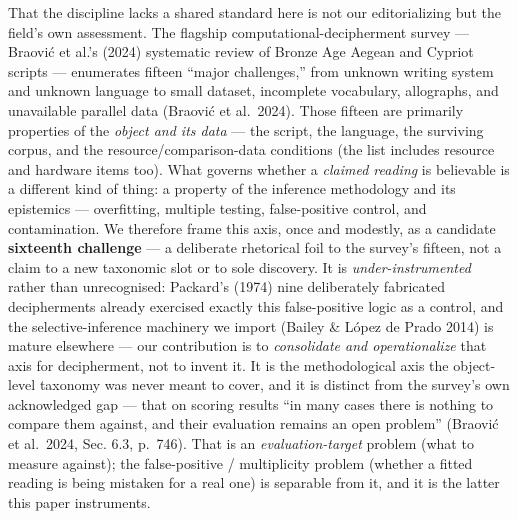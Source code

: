 \documentclass[
  10pt,
]{article}
\begin{document}
That the discipline lacks a shared standard here is not our
editorializing but the field's own assessment. The flagship
computational-decipherment survey --- Braović et al.'s (2024) systematic
review of Bronze Age Aegean and Cypriot scripts --- enumerates fifteen
``major challenges,'' from unknown writing system and unknown language
to small dataset, incomplete vocabulary, allographs, and unavailable
parallel data (Braović et al.~2024). Those fifteen are primarily
properties of the \emph{object and its data} --- the script, the
language, the surviving corpus, and the resource/comparison-data
conditions (the list includes resource and hardware items too). What
governs whether a \emph{claimed reading} is believable is a different
kind of thing: a property of the inference methodology and its
epistemics --- overfitting, multiple testing, false-positive control,
and contamination. We therefore frame this axis, once and modestly, as a
candidate \textbf{sixteenth challenge} --- a deliberate rhetorical foil
to the survey's fifteen, not a claim to a new taxonomic slot or to sole
discovery. It is \emph{under-instrumented} rather than unrecognised:
Packard's (1974) nine deliberately fabricated decipherments already
exercised exactly this false-positive logic as a control, and the
selective-inference machinery we import (Bailey \& López de Prado 2014)
is mature elsewhere --- our contribution is to \emph{consolidate and
operationalize} that axis for decipherment, not to invent it. It is the
methodological axis the object-level taxonomy was never meant to cover,
and it is distinct from the survey's own acknowledged gap --- that on
scoring results ``in many cases there is nothing to compare them
against, and their evaluation remains an open problem'' (Braović et
al.~2024, Sec. 6.3, p.~746). That is an \emph{evaluation-target} problem
(what to measure against); the false-positive / multiplicity problem
(whether a fitted reading is being mistaken for a real one) is separable
from it, and it is the latter this paper instruments.
\end{document}
